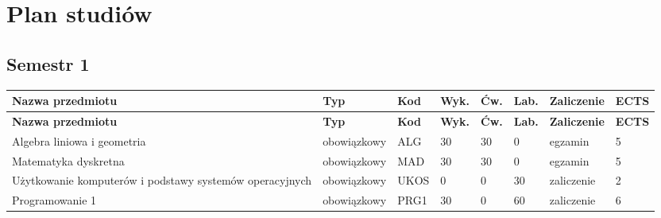 \documentclass[12pt,a4paper]{article}
\newcommand{\thdrule}{\noalign{\global\setlength{\extrarowheight}{0pt}}}
\newcommand{\thdend}{\noalign{\global\setlength{\extrarowheight}{4pt}}}
\begin{document}
\newpage

\section{Plan studiów}


\bigskip

\subsection*{Semestr 1}

{\scriptsize
\begin{longtable}{>{\RaggedRight}m{5.0cm}m{1.9cm}m{0.75cm}m{0.85cm}m{0.85cm}m{0.85cm}m{1.45cm}m{0.9cm}}
\thdrule\toprule
\rowcolor{pjatkRed}
{\color{white}\footnotesize\textbf{\vphantom{Ag}Nazwa przedmiotu}} & {\color{white}\footnotesize\textbf{\vphantom{Ag}Typ}} & {\color{white}\footnotesize\textbf{\vphantom{Ag}Kod}} & {\color{white}\footnotesize\textbf{\vphantom{Ag}Wyk.}} & {\color{white}\footnotesize\textbf{\vphantom{Ag}Ćw.}} & {\color{white}\footnotesize\textbf{\vphantom{Ag}Lab.}} & {\color{white}\footnotesize\textbf{\vphantom{Ag}Zaliczenie}} & {\color{white}\footnotesize\textbf{\vphantom{Ag}ECTS}} \\
\midrule\thdend
\endfirsthead
\thdrule\toprule
\rowcolor{pjatkRed}
{\color{white}\footnotesize\textbf{\vphantom{Ag}Nazwa przedmiotu}} & {\color{white}\footnotesize\textbf{\vphantom{Ag}Typ}} & {\color{white}\footnotesize\textbf{\vphantom{Ag}Kod}} & {\color{white}\footnotesize\textbf{\vphantom{Ag}Wyk.}} & {\color{white}\footnotesize\textbf{\vphantom{Ag}Ćw.}} & {\color{white}\footnotesize\textbf{\vphantom{Ag}Lab.}} & {\color{white}\footnotesize\textbf{\vphantom{Ag}Zaliczenie}} & {\color{white}\footnotesize\textbf{\vphantom{Ag}ECTS}} \\
\midrule\thdend
\endhead
\rowcolor{tableRowLight} Algebra liniowa i geometria & {\scriptsize obowiązkowy} & ALG & 30 & 30 & 0 & {\scriptsize egzamin} & 5 \\
\rowcolor{tableRowAlt} Matematyka dyskretna & {\scriptsize obowiązkowy} & MAD & 30 & 30 & 0 & {\scriptsize egzamin} & 5 \\
\rowcolor{tableRowLight} Użytkowanie komputerów i podstawy systemów operacyjnych & {\scriptsize obowiązkowy} & UKOS & 0 & 0 & 30 & {\scriptsize zaliczenie} & 2 \\
\rowcolor{tableRowAlt} Programowanie 1 & {\scriptsize obowiązkowy} & PRG1 & 30 & 0 & 60 & {\scriptsize zaliczenie} & 6 \\

\end{longtable}}
\end{document}
